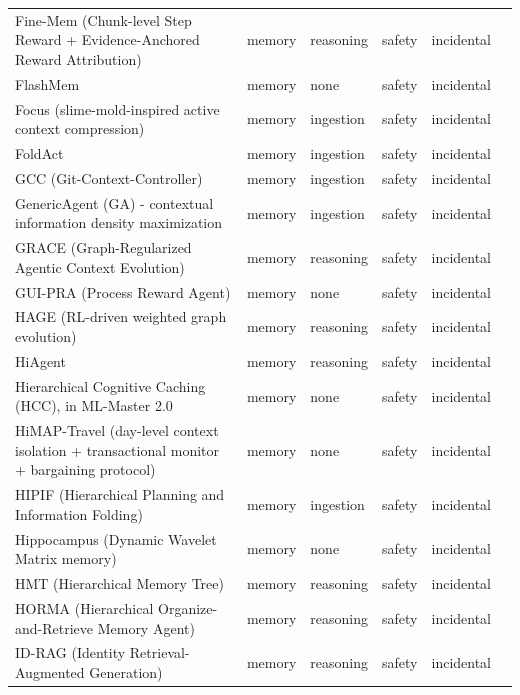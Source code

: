 \begin{longtable}{@{}>{\raggedright\arraybackslash}p{}lllll@{}}
Fine-Mem (Chunk-level Step Reward + Evidence-Anchored Reward Attribution) & memory & reasoning & safety & incidental & \cite{ma-2026-finemem} \\
FlashMem & memory & none & safety & incidental & \cite{hou-2026-flashmem} \\
Focus (slime-mold-inspired active context compression) & memory & ingestion & safety & incidental & \cite{verma-2026-active} \\
FoldAct & memory & ingestion & safety & incidental & \cite{shao-2025-foldact} \\
GCC (Git-Context-Controller) & memory & ingestion & safety & incidental & \cite{wu-2025-git} \\
GenericAgent (GA) - contextual information density maximization & memory & ingestion & safety & incidental & \cite{liang-2026-genericagent} \\
GRACE (Graph-Regularized Agentic Context Evolution) & memory & reasoning & safety & incidental & \cite{hsu-2026-scoped} \\
GUI-PRA (Process Reward Agent) & memory & none & safety & incidental & \cite{xiong-2025-guipra} \\
HAGE (RL-driven weighted graph evolution) & memory & reasoning & safety & incidental & \cite{jiang-2026-hage} \\
HiAgent & memory & reasoning & safety & incidental & \cite{hu-2024-hiagent} \\
Hierarchical Cognitive Caching (HCC), in ML-Master 2.0 & memory & none & safety & incidental & \cite{zhu-2026-ultralonghorizon} \\
HiMAP-Travel (day-level context isolation + transactional monitor + bargaining protocol) & memory & none & safety & incidental & \cite{bui-2026-himaptravel} \\
HIPIF (Hierarchical Planning and Information Folding) & memory & ingestion & safety & incidental & \cite{diao-2026-hipif} \\
Hippocampus (Dynamic Wavelet Matrix memory) & memory & none & safety & incidental & \cite{li-2026-hippocampus} \\
HMT (Hierarchical Memory Tree) & memory & reasoning & safety & incidental & \cite{tan-2026-enhancing} \\
HORMA (Hierarchical Organize-and-Retrieve Memory Agent) & memory & reasoning & safety & incidental & \cite{hsu-2026-organize} \\
ID-RAG (Identity Retrieval-Augmented Generation) & memory & reasoning & safety & incidental & \cite{platnick-2025-idrag} \\

\end{longtable}
